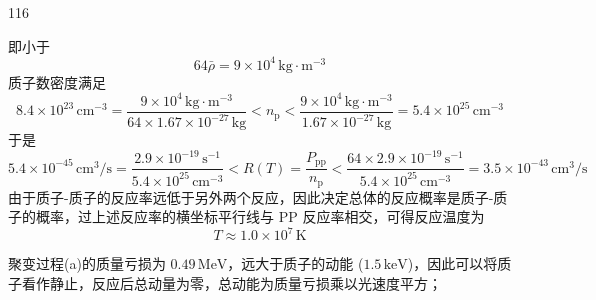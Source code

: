 \begin{solution}{116}
\begin{subsolution}
\begin{equation}
        \end{equation}
        即小于
        \begin{equation}
            64 \bar{\rho} = 9 \times 10^{4} \,\mathrm{kg \cdot m^{-3}}
        \end{equation}
        质子数密度满足
        \begin{equation}
            8.4 \times 10^{23} \,\mathrm{cm^{-3}} = \frac{9 \times 10^{4} \,\mathrm{kg \cdot m^{-3}}}{64 \times 1.67 \times 10^{-27} \,\mathrm{kg}} < n_{\mathrm{p}} < \frac{9 \times 10^{4} \,\mathrm{kg \cdot m^{-3}}}{1.67 \times 10^{-27} \,\mathrm{kg}} = 5.4 \times 10^{25} \,\mathrm{cm^{-3}}
        \end{equation}
        于是
        \begin{equation}
            5.4 \times 10^{-45} \,\mathrm{cm^{3}/s} = \frac{2.9 \times 10^{-19} \,\mathrm{s^{-1}}}{5.4 \times 10^{25} \,\mathrm{cm^{-3}}} < R(T) = \frac{P_{\mathrm{pp}}}{n_{\mathrm{p}}} < \frac{64 \times 2.9 \times 10^{-19} \,\mathrm{s^{-1}}}{5.4 \times 10^{25} \,\mathrm{cm^{-3}}} = 3.5 \times 10^{-43} \,\mathrm{cm^{3}/s}
            \label{eq:26.s116}
        \end{equation}
        由于质子-质子的反应率远低于另外两个反应，因此决定总体的反应概率是质子-质子的概率，过上述反应率的横坐标平行线与 PP 反应率相交，可得反应温度为
        \begin{equation}
            T \approx 1.0 \times 10^{7} \,\mathrm{K}
            \label{eq:27.s116}
        \end{equation}
    \end{subsolution}
    \begin{subsolution}
        聚变过程(a)的质量亏损为 $0.49 \,\mathrm{MeV}$，远大于质子的动能 ($1.5 \,\mathrm{keV}$)，因此可以将质子看作静止，反应后总动量为零，总动能为质量亏损乘以光速度平方；


\end{subsolution}
\end{solution}
